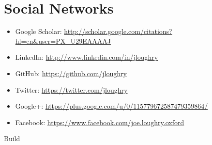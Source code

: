 \documentclass[letterpaper]{article}
\begin{document}
\section*{Social Networks} %


\begin{itemize}
	\item Google Scholar: \url{http://scholar.google.com/citations?hl=en&user=PX_U29EAAAAJ}
	\item LinkedIn: \url{http://www.linkedin.com/in/jloughry}
	\item GitHub: \url{https://github.com/jloughry}
	\item Twitter: \url{https://twitter.com/jloughry}
	\item Google+: \url{https://plus.google.com/u/0/115779672587479359864/}
	\item Facebook: \url{https://www.facebook.com/joe.loughry.oxford}
\end{itemize}

\vfill
{\tiny Build }
\end{document}
